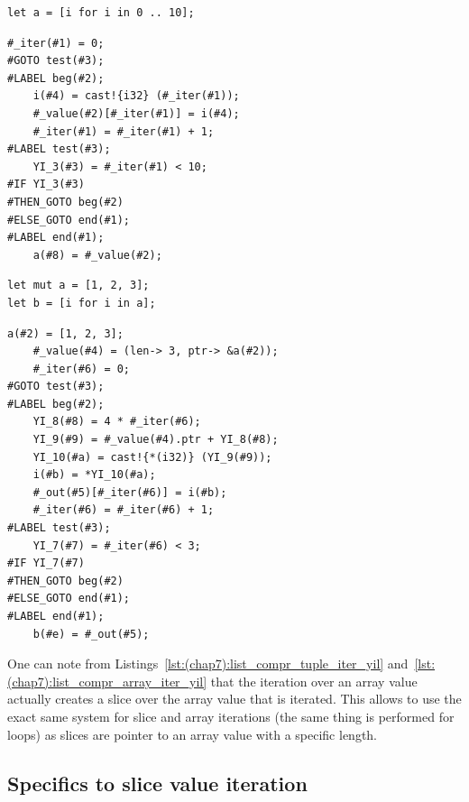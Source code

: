 \begin{lstlisting}[style=coloredverbatim, label=lst:(chap7):list_compr_range_iter, caption=List comprehension iterating over a range]
let a = [i for i in 0 .. 10];
\end{lstlisting}

\begin{lstlisting}[style=lyilVerb, label=lst:(chap7):list_compr_range_iter_yil, caption=YIL representation of Listing~\ref{lst:(chap7):list_compr_range_iter}]
    #_iter(#1) = 0;
#GOTO test(#3);
#LABEL beg(#2);
    i(#4) = cast!{i32} (#_iter(#1));
    #_value(#2)[#_iter(#1)] = i(#4);
    #_iter(#1) = #_iter(#1) + 1;
#LABEL test(#3);
    YI_3(#3) = #_iter(#1) < 10;
#IF YI_3(#3)
#THEN_GOTO beg(#2)
#ELSE_GOTO end(#1);
#LABEL end(#1);
    a(#8) = #_value(#2);
\end{lstlisting}

\begin{lstlisting}[style=coloredverbatim, label=lst:(chap7):list_compr_array_iter, caption=List comprehension iterating over an array]
let mut a = [1, 2, 3];
let b = [i for i in a];
\end{lstlisting}

\begin{lstlisting}[style=lyilVerb, label=lst:(chap7):list_compr_array_iter_yil, caption=YIL representation of Listing~\ref{lst:(chap7):list_compr_array_iter}]
    a(#2) = [1, 2, 3];
    #_value(#4) = (len-> 3, ptr-> &a(#2));
    #_iter(#6) = 0;
#GOTO test(#3);
#LABEL beg(#2);
    YI_8(#8) = 4 * #_iter(#6);
    YI_9(#9) = #_value(#4).ptr + YI_8(#8);
    YI_10(#a) = cast!{*(i32)} (YI_9(#9));
    i(#b) = *YI_10(#a);
    #_out(#5)[#_iter(#6)] = i(#b);
    #_iter(#6) = #_iter(#6) + 1;
#LABEL test(#3);
    YI_7(#7) = #_iter(#6) < 3;
#IF YI_7(#7)
#THEN_GOTO beg(#2)
#ELSE_GOTO end(#1);
#LABEL end(#1);
    b(#e) = #_out(#5);
\end{lstlisting}

One can note from Listings~\ref{lst:(chap7):list_compr_tuple_iter_yil}
and~\ref{lst:(chap7):list_compr_array_iter_yil} that the iteration over an array value
actually creates a slice over the array value that is iterated. This allows to
use the exact same system for slice and array iterations (the same thing is
performed for  loops) as slices are pointer to an array value with a
specific length.

\subsection{Specifics to slice value iteration}

